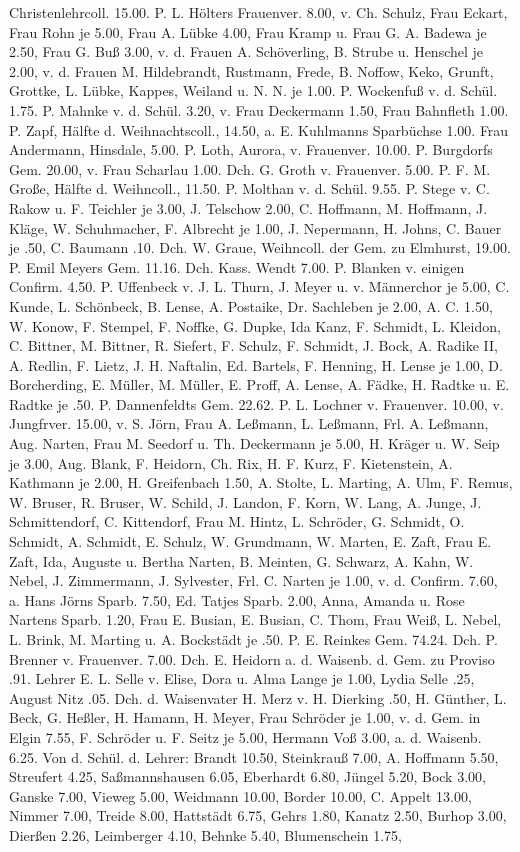 Christenlehrcoll. 15.00. P. L. Hölters Frauenver. 8.00, v. Ch. Schulz, Frau Eckart, Frau Rohn je 5.00, Frau A. Lübke 4.00, Frau Kramp u. Frau G. A. Badewa je 2.50, Frau G. Buß 3.00, v. d. Frauen A. Schöverling, B. Strube u. Henschel je 2.00, v. d. Frauen M. Hildebrandt, Rustmann, Frede, B. Noffow, Keko, Grunft, Grottke, L. Lübke, Kappes, Weiland u. N. N. je 1.00. P. Wockenfuß v. d. Schül. 1.75. P. Mahnke v. d. Schül. 3.20, v. Frau Deckermann 1.50, Frau Bahnfleth 1.00. P. Zapf, Hälfte d. Weihnachtscoll., 14.50, a. E. Kuhlmanns Sparbüchse 1.00. Frau Andermann, Hinsdale, 5.00. P. Loth, Aurora, v. Frauenver. 10.00. P. Burgdorfs Gem. 20.00, v. Frau Scharlau 1.00. Dch. G. Groth v. Frauenver. 5.00. P. F. M. Große, Hälfte d. Weihncoll., 11.50. P. Molthan v. d. Schül. 9.55. P. Stege v. C. Rakow u. F. Teichler je 3.00, J. Telschow 2.00, C. Hoffmann, M. Hoffmann, J. Kläge, W. Schuhmacher, F. Albrecht je 1.00, J. Nepermann, H. Johns, C. Bauer je .50, C. Baumann .10. Dch. W. Graue, Weihncoll. der Gem. zu Elmhurst, 19.00. P. Emil Meyers Gem. 11.16. Dch. Kass. Wendt 7.00. P. Blanken v. einigen Confirm. 4.50. P. Uffenbeck v. J. L. Thurn, J. Meyer u. v. Männerchor je 5.00, C. Kunde, L. Schönbeck, B. Lense, A. Postaike, Dr. Sachleben je 2.00, A. C. 1.50, W. Konow, F. Stempel, F. Noffke, G. Dupke, Ida Kanz, F. Schmidt, L. Kleidon, C. Bittner, M. Bittner, R. Siefert, F. Schulz, F. Schmidt, J. Bock, A. Radike II, A. Redlin, F. Lietz, J. H. Naftalin, Ed. Bartels, F. Henning, H. Lense je 1.00, D. Borcherding, E. Müller, M. Müller, E. Proff, A. Lense, A. Fädke, H. Radtke u. E. Radtke je .50. P. Dannenfeldts Gem. 22.62. P. L. Lochner v. Frauenver. 10.00, v. Jungfrver. 15.00, v. S. Jörn, Frau A. Leßmann, L. Leßmann, Frl. A. Leßmann, Aug. Narten, Frau M. Seedorf u. Th. Deckermann je 5.00, H. Kräger u. W. Seip je 3.00, Aug. Blank, F. Heidorn, Ch. Rix, H. F. Kurz, F. Kietenstein, A. Kathmann je 2.00, H. Greifenbach 1.50, A. Stolte, L. Marting, A. Ulm, F. Remus, W. Bruser, R. Bruser, W. Schild, J. Landon, F. Korn, W. Lang, A. Junge, J. Schmittendorf, C. Kittendorf, Frau M. Hintz, L. Schröder, G. Schmidt, O. Schmidt, A. Schmidt, E. Schulz, W. Grundmann, W. Marten, E. Zaft, Frau E. Zaft, Ida, Auguste u. Bertha Narten, B. Meinten, G. Schwarz, A. Kahn, W. Nebel, J. Zimmermann, J. Sylvester, Frl. C. Narten je 1.00, v. d. Confirm. 7.60, a. Hans Jörns Sparb. 7.50, Ed. Tatjes Sparb. 2.00, Anna, Amanda u. Rose Nartens Sparb. 1.20, Frau E. Busian, E. Busian, C. Thom, Frau Weiß, L. Nebel, L. Brink, M. Marting u. A. Bockstädt je .50. P. E. Reinkes Gem. 74.24. Dch. P. Brenner v. Frauenver. 7.00. Dch. E. Heidorn a. d. Waisenb. d. Gem. zu Proviso .91. Lehrer E. L. Selle v. Elise, Dora u. Alma Lange je 1.00, Lydia Selle .25, August Nitz .05. Dch. d. Waisenvater H. Merz v. H. Dierking .50, H. Günther, L. Beck, G. Heßler, H. Hamann, H. Meyer, Frau Schröder je 1.00, v. d. Gem. in Elgin 7.55, F. Schröder u. F. Seitz je 5.00, Hermann Voß 3.00, a. d. Waisenb. 6.25. Von d. Schül. d. Lehrer: Brandt 10.50, Steinkrauß 7.00, A. Hoffmann 5.50, Streufert 4.25, Saßmannshausen 6.05, Eberhardt 6.80, Jüngel 5.20, Bock 3.00, Ganske 7.00, Vieweg 5.00, Weidmann 10.00, Border 10.00, C. Appelt 13.00, Nimmer 7.00, Treide 8.00, Hattstädt 6.75, Gehrs 1.80, Kanatz 2.50, Burhop 3.00, Dierßen 2.26, Leimberger 4.10, Behnke 5.40, Blumenschein 1.75, 